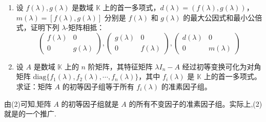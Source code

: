 \documentclass[../../main.tex]{subfiles}
\begin{document}
\begin{theorem}\label{theorem:lambda-矩阵和初等因子的基本性质}
\begin{enumerate}[(1)]
\item 设 \(f(\lambda),g(\lambda)\) 是数域 \(\mathbb{K}\) 上的首一多项式，\(d(\lambda)=(f(\lambda),g(\lambda))\)，\(m(\lambda)=[f(\lambda),g(\lambda)]\) 分别是 \(f(\lambda)\) 和 \(g(\lambda)\) 的最大公因式和最小公倍式，证明下列 \(\lambda\)-矩阵相抵：
\[
\begin{pmatrix}
f(\lambda) & 0 \\
0 & g(\lambda)
\end{pmatrix}, 
\begin{pmatrix}
g(\lambda) & 0 \\
0 & f(\lambda)
\end{pmatrix}, 
\begin{pmatrix}
d(\lambda) & 0 \\
0 & m(\lambda)
\end{pmatrix}
\]

\item 设 \(A\) 是数域 \(\mathbb{K}\) 上的 \(n\) 阶矩阵，其特征矩阵 \(\lambda I_n - A\) 经过初等变换可化为对角矩阵 \(\mathrm{diag}\{f_1(\lambda),f_2(\lambda),\cdots,f_n(\lambda)\}\)，其中 \(f_i(\lambda)\) 是 \(\mathbb{K}\) 上的首一多项式。求证：矩阵 \(A\) 的初等因子组等于所有 \(f_i(\lambda)\) 的准素因子组。
\end{enumerate}
\end{theorem}
\begin{note}
由(2)可知,矩阵 \(A\) 的初等因子组就是 \(A\) 的所有不变因子的准素因子组。实际上,(2)就是的一个推广.
\end{note}
\end{document}
